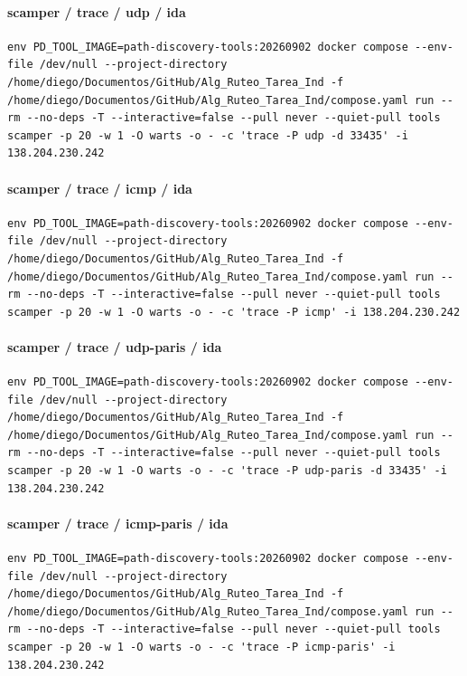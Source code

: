 \paragraph{scamper / trace / udp / ida}
\begin{lstlisting}
env PD_TOOL_IMAGE=path-discovery-tools:20260902 docker compose --env-file /dev/null --project-directory /home/diego/Documentos/GitHub/Alg_Ruteo_Tarea_Ind -f /home/diego/Documentos/GitHub/Alg_Ruteo_Tarea_Ind/compose.yaml run --rm --no-deps -T --interactive=false --pull never --quiet-pull tools scamper -p 20 -w 1 -O warts -o - -c 'trace -P udp -d 33435' -i 138.204.230.242
\end{lstlisting}
\paragraph{scamper / trace / icmp / ida}
\begin{lstlisting}
env PD_TOOL_IMAGE=path-discovery-tools:20260902 docker compose --env-file /dev/null --project-directory /home/diego/Documentos/GitHub/Alg_Ruteo_Tarea_Ind -f /home/diego/Documentos/GitHub/Alg_Ruteo_Tarea_Ind/compose.yaml run --rm --no-deps -T --interactive=false --pull never --quiet-pull tools scamper -p 20 -w 1 -O warts -o - -c 'trace -P icmp' -i 138.204.230.242
\end{lstlisting}
\paragraph{scamper / trace / udp-paris / ida}
\begin{lstlisting}
env PD_TOOL_IMAGE=path-discovery-tools:20260902 docker compose --env-file /dev/null --project-directory /home/diego/Documentos/GitHub/Alg_Ruteo_Tarea_Ind -f /home/diego/Documentos/GitHub/Alg_Ruteo_Tarea_Ind/compose.yaml run --rm --no-deps -T --interactive=false --pull never --quiet-pull tools scamper -p 20 -w 1 -O warts -o - -c 'trace -P udp-paris -d 33435' -i 138.204.230.242
\end{lstlisting}
\paragraph{scamper / trace / icmp-paris / ida}
\begin{lstlisting}
env PD_TOOL_IMAGE=path-discovery-tools:20260902 docker compose --env-file /dev/null --project-directory /home/diego/Documentos/GitHub/Alg_Ruteo_Tarea_Ind -f /home/diego/Documentos/GitHub/Alg_Ruteo_Tarea_Ind/compose.yaml run --rm --no-deps -T --interactive=false --pull never --quiet-pull tools scamper -p 20 -w 1 -O warts -o - -c 'trace -P icmp-paris' -i 138.204.230.242
\end{lstlisting}

